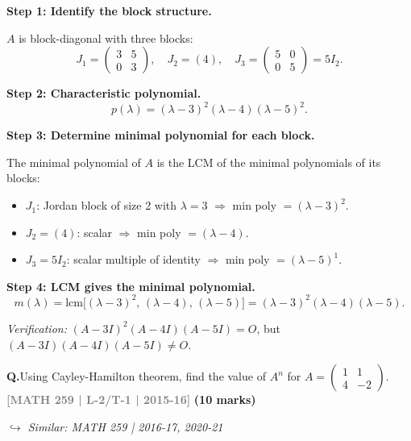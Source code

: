 \documentclass[12pt,a3paper]{article}
\newcommand{\yr}[1]{\hfill\textcolor{gray}{\small\textbf{[#1]}}}
\newcommand{\mk}[1]{\textcolor{orange!70!black}{\small\textbf{(#1 marks)}}}
\newcommand{\variant}[1]{\par\vspace{1pt}\textcolor{blue!50!black}%
  {\footnotesize\textit{$\hookrightarrow$ Similar: #1}}}
\newcounter{qnum}
\newcommand{\Q}[1]{%
  \needspace{4\baselineskip}
  \refstepcounter{qnum}
  \vspace{6pt}
  \noindent\textbf{Q\theqnum.}\enspace #1\par
}
\begin{document}
\begin{tcolorbox}[enhanced,breakable,
  colback=cE!4,colframe=cE,boxrule=0.8pt,arc=5pt,
  title={\textbf{Answer --- Minimal Polynomial of $A$ (5$\times$5)}},
  fonttitle=\bfseries\color{white},colbacktitle=cE]

\textbf{Step 1: Identify the block structure.}

$A$ is block-diagonal with three blocks:
\[
J_1=\begin{pmatrix}3&5\\0&3\end{pmatrix},\quad J_2=(4),\quad J_3=\begin{pmatrix}5&0\\0&5\end{pmatrix}=5I_2.
\]

\textbf{Step 2: Characteristic polynomial.}
\[
p(\lambda)=(\lambda-3)^2(\lambda-4)(\lambda-5)^2.
\]

\textbf{Step 3: Determine minimal polynomial for each block.}

The minimal polynomial of $A$ is the LCM of the minimal polynomials of its blocks:

\begin{itemize}
  \item $J_1$: Jordan block of size 2 with $\lambda=3$ $\Rightarrow$ min poly $= (\lambda-3)^2$.
  \item $J_2=(4)$: scalar $\Rightarrow$ min poly $= (\lambda-4)$.
  \item $J_3=5I_2$: scalar multiple of identity $\Rightarrow$ min poly $= (\lambda-5)^1$.
\end{itemize}

\textbf{Step 4: LCM gives the minimal polynomial.}
\[
\boxed{m(\lambda)=\mathrm{lcm}\bigl[(\lambda-3)^2,\,(\lambda-4),\,(\lambda-5)\bigr]=(\lambda-3)^2(\lambda-4)(\lambda-5).}
\]

\textit{Verification:} $(A-3I)^2(A-4I)(A-5I)=O$, but $(A-3I)(A-4I)(A-5I)\neq O$.\;\checkmark

\end{tcolorbox}

\Q{Using Cayley-Hamilton theorem, find the value of $A^n$ for $A = \begin{pmatrix} 1 & 1 \\ 4 & -2 \end{pmatrix}$.
\yr{MATH 259 | L-2/T-1 | 2015-16} \mk{10}
\variant{MATH 259 | 2016-17, 2020-21}}
\end{document}
